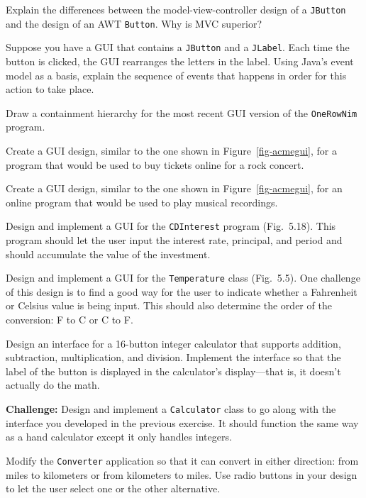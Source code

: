 \begin{EXRtwo}
\item  Explain the differences between the model-view-controller
design of a {\tt JButton} and the design of an AWT {\tt Button}.
Why is MVC superior?

\item  Suppose you have a GUI that contains a \mbox{\tt JButton}
and a {\tt JLabel}. Each time the button is clicked, the GUI
rearranges the letters in the label. Using Java's event model as a
basis, explain the sequence of events that happens in order for this
action to take place.

\item Draw a containment hierarchy for the most recent GUI version of the
{\tt OneRowNim} program.

\item  Create a GUI design, similar to the one shown in
Figure~\ref{fig-acmegui}, for a program that would be
used to buy tickets online for a rock concert.

\item  Create a GUI design, similar to the one shown in
Figure~\ref{fig-acmegui}, for an online program that
would be used to play musical recordings.

\item  Design and implement a GUI for the {\tt CDInterest}
program (Fig.~5.18). This program should
let the user input the interest rate, principal, and period
and should accumulate the value of the investment.

\item  Design and implement a GUI for the {\tt Temperature}
class (Fig.~5.5). One challenge of
this design is to find a good way for the user to indicate
whether a Fahrenheit or Celsius value is being input. This
should also determine the order of the conversion: F to C
or C to F.

\item  Design an interface for a 16-button integer calculator that supports
addition, subtraction, multiplication, and division. Implement
the interface so that the label of the button is displayed in the
calculator's display---that is, it doesn't actually do the math.

\item  {\bf Challenge: } Design and implement a {\tt Calculator}
class to go along with the interface you developed in the previous
exercise. It should function the same way as a hand calculator except
it only handles integers.

\item  Modify the {\tt Converter} application so that it can convert
in either direction: from miles to kilometers or from kilometers to
miles. Use radio buttons in your design to let the user select one or
the other alternative.


\end{EXRtwo}

